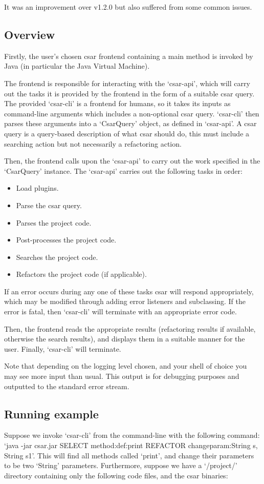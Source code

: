 \documentclass[12pt, letterpaper]{article}
\begin{document}
It was an improvement over v1.2.0 but also suffered from some common issues.

\subsection{Overview}
Firstly, the user's chosen csar frontend containing a main method is invoked by Java (in particular the Java Virtual Machine).

The frontend is responsible for interacting with the `csar-api', which will carry out the tasks it is provided by the frontend in the form of a suitable csar query.
The provided `csar-cli' is a frontend for humans, so it takes its inputs as command-line arguments which includes a non-optional csar query.
`csar-cli' then parses these arguments into a `CsarQuery' object, as defined in `csar-api'.
A csar query is a query-based description of what csar should do, this must include a searching action but not necessarily a refactoring action.

Then, the frontend calls upon the `csar-api' to carry out the work specified in the `CsarQuery' instance.
The `csar-api' carries out the following tasks in order:
\begin{itemize}
  \item Load plugins.
  \item Parse the csar query.
  \item Parses the project code.
  \item Post-processes the project code.
  \item Searches the project code.
  \item Refactors the project code (if applicable).
\end{itemize}
If an error occurs during any one of these tasks csar will respond appropriately, which may be modified through adding error listeners and subclassing.
If the error is fatal, then `csar-cli' will terminate with an appropriate error code.

Then, the frontend reads the appropriate results (refactoring results if available, otherwise the search results), and displays them in a suitable manner for the user.
Finally, `csar-cli' will terminate.

Note that depending on the logging level chosen, and your shell of choice you may see more input than usual.
This output is for debugging purposes and outputted to the standard error stream.

\subsection{Running example}
Suppose we invoke `csar-cli' from the command-line with the following command: `java -jar csar.jar SELECT method:def:print REFACTOR changeparam:String s, String s1'.
This will find all methods called `print', and change their parameters to be two `String' parameters.
Furthermore, suppose we have a `/project/' directory containing only the following code files, and the csar binaries:
\end{document}
